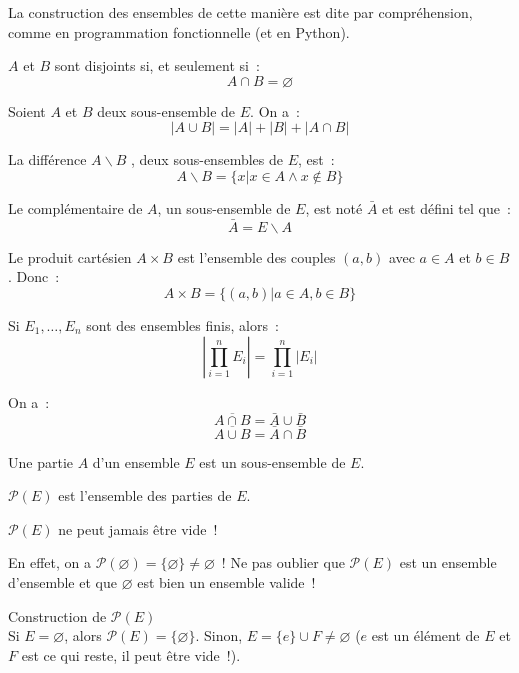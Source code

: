 \documentclass[a4paper, titlepage]{article}
\newenvironment{lititle}%
{\vspace{7mm}\LobsterTwo \large}%
{\\}
\begin{document}
    La construction des ensembles de cette manière est dite par compréhension, comme en programmation fonctionnelle (et
    en Python).
    \begin{defn}
        $A$ et $B$ sont disjoints si, et seulement si~:
        $$ A\cap B = \varnothing $$
    \end{defn}
    \begin{thm}
        Soient $A$ et $B$ deux sous-ensemble de $E$.
        On a~:
        $$ |A\cup B| = |A|+|B|+|A\cap B| $$
    \end{thm}
    \begin{defn}
        La différence $A\backslash B$ , deux sous-ensembles de $E$, est~:
        $$ A\backslash B = \{x|x\in A\land x\notin B\} $$
    \end{defn}
    \begin{defn}
        Le complémentaire de $A$, un sous-ensemble de $E$, est noté $\bar A$ et est défini tel que~:
        $$ \bar A= E\backslash A $$
    \end{defn}
    \begin{defn}
        Le produit cartésien $A\times B$ est l'ensemble des couples $(a,b)$ avec $a\in A$ et $b\in B$.
        Donc~:
        $$ A\times B = \{(a,b)|a\in A,b\in B\} $$
    \end{defn}
    \begin{props}
        Si $E_1,\ldots,E_n$ sont des ensembles finis, alors~:
        $$\left|\prod^n_{i=1} E_i\right| = \prod^n_{i=1}|E_i|$$
    \end{props}
    \begin{props}
        On a~:
        $$ \overline{A\cap B} = \bar A\cup\bar B $$
        $$ \overline{A\cup B} = \bar A\cap\bar B $$
    \end{props}
    \begin{defn}
        Une partie $A$ d'un ensemble $E$ est un sous-ensemble de $E$.

        $\mathcal{P}(E)$ est l'ensemble des parties de $E$.
    \end{defn}
    \begin{warn}
        $\mathcal{P}(E)$ ne peut jamais être vide~!

        En effet, on a $\mathcal{P}(\varnothing) = \{\varnothing\} \neq \varnothing$~!
        Ne pas oublier que $\mathcal{P}(E)$ est un ensemble d'ensemble et que $\varnothing$ est bien un ensemble valide~!
    \end{warn}
    \begin{lititle}
        Construction de $\mathcal{P}(E)$
    \end{lititle}
    Si $E=\varnothing$, alors $\mathcal{P}(E) = \{\varnothing\}$.
    Sinon, $E=\{e\}\cup F\neq\varnothing$ ($e$ est un élément de $E$ et $F$ est ce qui reste, il peut être vide~!).
\end{document}
